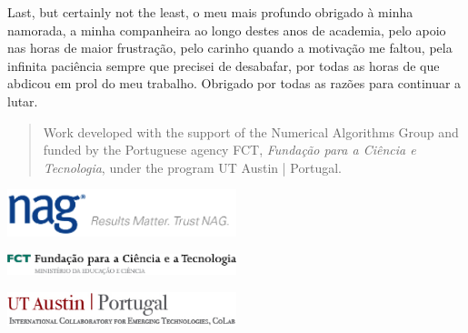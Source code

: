 \documentclass[../extabst]{subfiles}
\begin{document}
	Last, but certainly not the least, o meu mais profundo obrigado à minha namorada, a minha companheira ao longo destes anos de academia, pelo apoio nas horas de maior frustração, pelo carinho quando a motivação me faltou, pela infinita paciência sempre que precisei de desabafar, por todas as horas de que abdicou em prol do meu trabalho. Obrigado por todas as razões para continuar a lutar.

	\vfill

	\begin{quote}
		Work developed with the support of the Numerical Algorithms Group and funded by the Portuguese agency FCT, \textit{Fundação para a Ciência e Tecnologia}, under the program UT Austin | Portugal.
	\end{quote}

	\begin{center}
		\includegraphics[width=0.5\textwidth]{assets/images/nag.png}

		\includegraphics[width=0.5\textwidth]{assets/images/fct.png}
		
		\includegraphics[width=0.5\textwidth]{assets/images/utaustin.png}
	\end{center}
\end{document}
